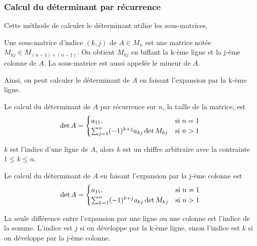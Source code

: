 \subsubsection{Calcul du déterminant par récurrence}
Cette méthode de calculer le déterminant utilise les sous-matrices.
\begin{definition}
    \label{sous_matrice}
    Une sous-matrice d'indice $(k, j)$ de $A \in M_n$ est une matrice notée $M_{kj} \in M_{(n-1) \times (n-1)}$. On obtient $M_{kj}$ en biffant la k-ème ligne et la j-ème colonne de $A$. La sous-matrice est aussi appelée le mineur de $A$.
\end{definition}
Ainsi, on peut calculer le déterminant de $A$ en faisant l'expansion par la k-ème ligne.
\begin{theorem}
    Le calcul du déterminant de $A$ par récurrence sur $n$, la taille de la matrice, est
    \[
        \det A = \begin{cases}
            a_{11},                                          & \textup{si } n = 1 \\
            \sum_{j = 1}^{n} (-1)^{k + j}a_{kj} \det{M_{kj}} & \textup{si } n > 1
        \end{cases}
    \]
\end{theorem}
\begin{remark}
    $k$ est l'indice d'une ligne de $A$, alors $k$ est un chiffre arbitraire avec la contrainte $1 \leq k \leq n$.
\end{remark}
\begin{corollary}
    Le calcul du déterminant de $A$ en faisant l'expansion par la j-ème colonne est
    \[
        \det A = \begin{cases}
            a_{11},                                          & \textup{si } n = 1 \\
            \sum_{k = 1}^{n} (-1)^{k + j}a_{kj} \det{M_{kj}} & \textup{si } n > 1
        \end{cases}
    \]
\end{corollary}
\begin{remark}
    La seule différence entre l'expansion par une ligne ou une colonne est l'indice de la somme. L'indice est $j$ si on développe par la k-ème ligne, sinon l'indice est $k$ si on développe par la j-ème colonne.
\end{remark}


